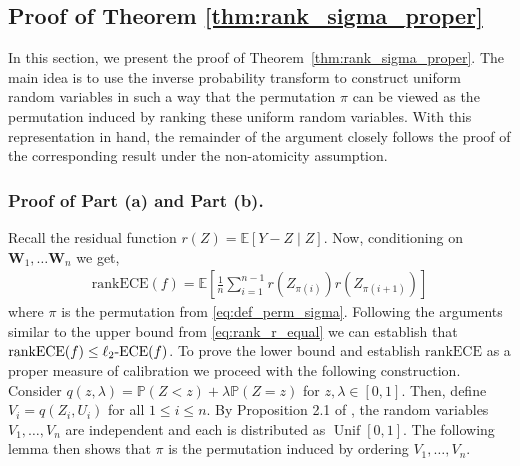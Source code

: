 \documentclass[11pt]{article}
\numberwithin{equation}{section}
\theoremstyle{definition}
\newcommand{\E}{\mathbb{E}}
\renewcommand{\P}{\mathbb{P}}
\newcommand{\bW}{\bm{W}}
\newcommand{\ECE}{\mathrm{ECE}}
\newcommand{\lECE}{\ell_2\textnormal{-}\ECE}
\newcommand{\rankECE}{\mathrm{rankECE}}
\begin{document}
\subsection{Proof of Theorem \ref{thm:rank_sigma_proper}}\label{appendix:proofof_rank_proper_sigma}


In this section, we present the proof of Theorem~\ref{thm:rank_sigma_proper}. The main idea is to use the inverse probability transform to construct uniform random variables in such a way that the permutation $\pi$ can be viewed as the permutation induced by ranking these uniform random variables. With this representation in hand, the remainder of the argument closely follows the proof of the corresponding result under the non-atomicity assumption.

\subsubsection{Proof of Part (a) and Part (b).}

Recall the residual function $r(Z) = \E[Y-Z\mid Z]$. Now, conditioning on $\bW_1,\ldots\bW_n$ we get,
\begin{align}\label{eq:rankece_sigma_Z}
    \rankECE(f) = \E\left[\frac{1}{n}\sum_{i=1}^{n-1}r\left(Z_{\pi(i)}\right)r\left(Z_{\pi(i+1)}\right)\right]
\end{align}
where $\pi$ is the permutation from \eqref{eq:def_perm_sigma}. Following the arguments similar to the upper bound from \eqref{eq:rank_r_equal} we can establish that $\rankECE(f)\leq \lECE(f)$. To prove the lower bound and establish $\rankECE$ as a proper measure of calibration we proceed with the following construction. Consider $q(z,\lambda) = \P(Z<z) + \lambda\P(Z = z)$ for $z,\lambda\in [0,1]$. Then, define $V_i = q(Z_i,U_i)$ for all $1\leq i\leq n$. By Proposition 2.1 of \cite{ruschendorf2009distributional}, the random variables \(V_1,\ldots,V_n\) are independent and each is distributed as \(\operatorname{Unif}[0,1]\).
 The following lemma then shows that $\pi$ is the permutation induced by ordering $V_1,\ldots, V_n$.
\end{document}
